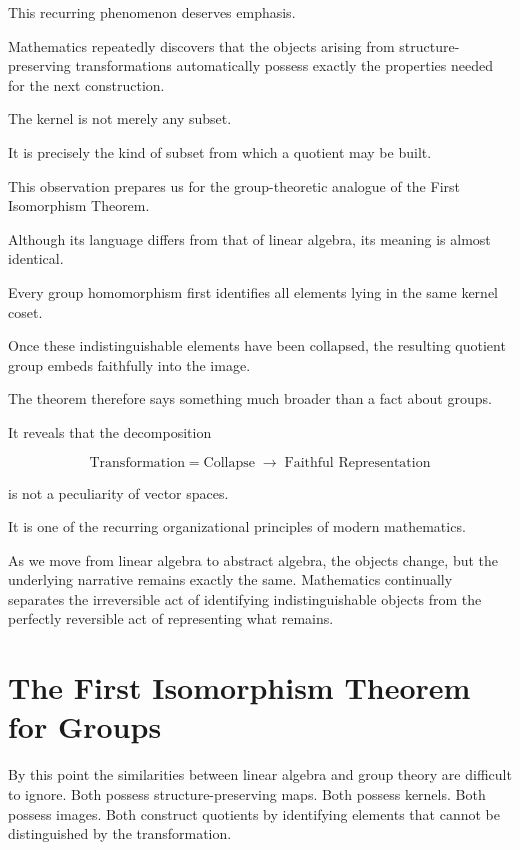 \documentclass[11pt]{book}
\numberwithin{equation}{chapter}
\theoremstyle{definition}
\theoremstyle{plain}
\theoremstyle{remark}
\begin{document}
This recurring phenomenon deserves emphasis.

Mathematics repeatedly discovers that the objects arising from structure-preserving transformations automatically possess exactly the properties needed for the next construction.

The kernel is not merely any subset.

It is precisely the kind of subset from which a quotient may be built.

This observation prepares us for the group-theoretic analogue of the First Isomorphism Theorem.

Although its language differs from that of linear algebra, its meaning is almost identical.

Every group homomorphism first identifies all elements lying in the same kernel coset.

Once these indistinguishable elements have been collapsed, the resulting quotient group embeds faithfully into the image.

The theorem therefore says something much broader than a fact about groups.

It reveals that the decomposition

\[
\boxed{
\text{Transformation}
=
\text{Collapse}
\;\longrightarrow\;
\text{Faithful Representation}
}
\]

is not a peculiarity of vector spaces.

It is one of the recurring organizational principles of modern mathematics.

As we move from linear algebra to abstract algebra, the objects change, but the underlying narrative remains exactly the same. Mathematics continually separates the irreversible act of identifying indistinguishable objects from the perfectly reversible act of representing what remains.


\section{The First Isomorphism Theorem for Groups}

By this point the similarities between linear algebra and group theory are difficult to ignore. Both possess structure-preserving maps. Both possess kernels. Both possess images. Both construct quotients by identifying elements that cannot be distinguished by the transformation.
\end{document}

